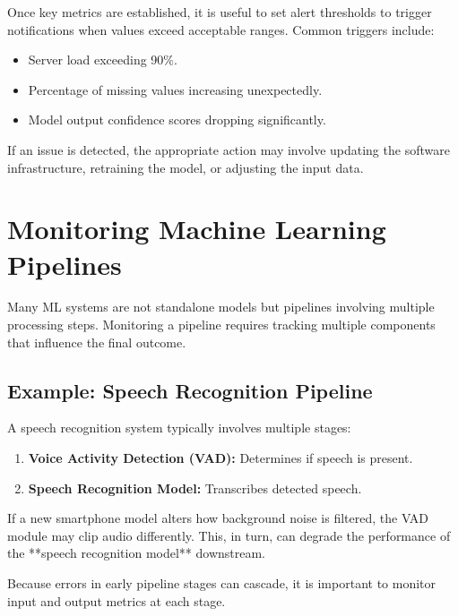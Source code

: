 \documentclass[12pt,openany]{book}
\begin{document}
Once key metrics are established, it is useful to set alert thresholds to trigger notifications when values exceed acceptable ranges. Common triggers include:

\begin{itemize}
    \item Server load exceeding 90\%.
    \item Percentage of missing values increasing unexpectedly.
    \item Model output confidence scores dropping significantly.
\end{itemize}

If an issue is detected, the appropriate action may involve updating the software infrastructure, retraining the model, or adjusting the input data.



\section{Monitoring Machine Learning Pipelines}

Many ML systems are not standalone models but pipelines involving multiple processing steps. Monitoring a pipeline requires tracking multiple components that influence the final outcome.


\subsection{Example: Speech Recognition Pipeline}

A speech recognition system typically involves multiple stages:

\begin{enumerate}
    \item \textbf{Voice Activity Detection (VAD):} Determines if speech is present.
    \item \textbf{Speech Recognition Model:} Transcribes detected speech.
\end{enumerate}

\begin{examplebox}
   If a new smartphone model alters how background noise is filtered, the VAD module may clip audio differently. This, in turn, can degrade the performance of the **speech recognition model** downstream.
\end{examplebox}

Because errors in early pipeline stages can cascade, it is important to monitor input and output metrics at each stage.
\end{document}
